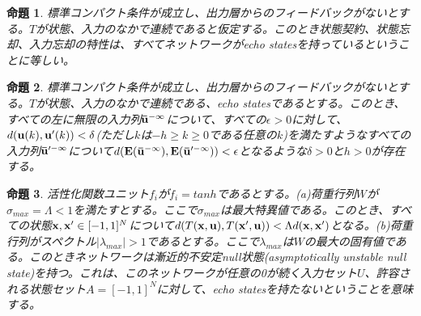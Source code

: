 \documentclass{jsarticle}
\newtheorem{pps}{命題}
\begin{document}
\begin{pps}
標準コンパクト条件が成立し、出力層からのフィードバックがないとする。$T$が状態、入力のなかで連続であると仮定する。このとき状態契約、状態忘却、入力忘却の特性は、すべてネットワークがecho statesを持っているということに等しい。
\end{pps}
\begin{pps}
標準コンパクト条件が成立し、出力層からのフィードバックがないとする。$T$が状態、入力のなかで連続である、echo statesであるとする。このとき、すべての左に無限の入力列${\bf \bar u}^{- \infty}$について、すべての$\epsilon >0$に対して、$d({\bf u}(k),{{\bf u}'}(k))<\delta$(ただし$k$は$-h \geq k \geq 0$である任意の$k$)を満たすようなすべての入力列${\bf {\bar u}}'^{- \infty}$について$d({\bf E}({\bf \bar u}^{- \infty}),{\bf E}({\bf \bar u}'^{- \infty}))< \epsilon$となるような$\delta >0$と$h >0$が存在する。
\end{pps}
\begin{pps}
活性化関数ユニット$f_{i}$が$f_{i}=tanh$であるとする。(a)荷重行列$W$が$\sigma_{max}=\Lambda < 1$を満たすとする。ここで$\sigma_{max}$は最大特異値である。このとき、すべての状態${\bf x},{\bf x'}\in [-1,1]^{N}$について$d(T({\bf x},{\bf u}),T({\bf x'},{\bf u}))< \Lambda d({\bf x}, {\bf x'})$となる。(b)荷重行列がスペクトル$|\lambda_{max}|>1$であるとする。ここで$\lambda_{max}$は$W$の最大の固有値である。このときネットワークは漸近的不安定null状態(asymptotically unstable null state)を持つ。これは、このネットワークが任意の0が続く入力セット$U$、許容される状態セット$A=[-1,1]^{N}$に対して、echo statesを持たないということを意味する。
\end{pps}
\end{document}
